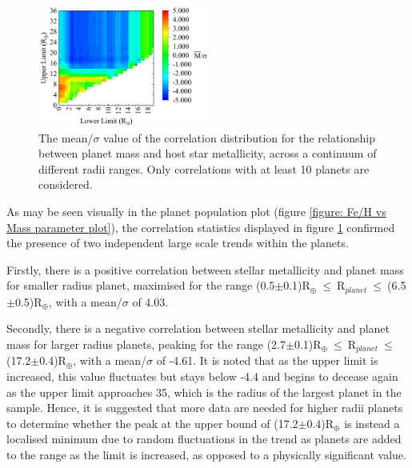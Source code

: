 \documentclass[a4paper,twocolumn,12pt]{article}
\begin{document}
\begin{figure}[h!]
    \centering
    \includegraphics[width=0.5\textwidth]{Graphs/FeH vs Mass correlations - Radii ranges.pdf}
    \caption{The mean/$\sigma$ value of the correlation distribution for the relationship between planet mass and host star metallicity, across a continuum of different radii ranges. Only correlations with at least 10 planets are considered.}
    \label{figure: Fe/H vs Mass correlations - Radii ranges}
\end{figure}

As may be seen visually in the planet population plot (figure \ref{figure: Fe/H vs Mass parameter plot}), the correlation statistics displayed in figure \ref{figure: Fe/H vs Mass correlations - Radii ranges} confirmed the presence of two independent large scale trends within the planets.

Firstly, there is a positive correlation between stellar metallicity and planet mass for smaller radius planet, maximised for the range (0.5$\pm$0.1)R$_{\oplus}~\leq~$R$_{planet}~\leq~$(6.5$\pm$0.5)R$_{\oplus}$, with a mean/$\sigma$ of 4.03. %

Secondly, there is a negative correlation between stellar metallicity and planet mass for larger radius planets, peaking for the range (2.7$\pm$0.1)R$_{\oplus}~\leq~$R$_{planet}~\leq~$(17.2$\pm$0.4)R$_{\oplus}$, with a mean/$\sigma$ of -4.61. It is noted that as the upper limit is increased, this value fluctuates but stays below -4.4 and begins to decease again as the upper limit approaches 35, which is the radius of the largest planet in the sample. Hence, it is suggested that more data are needed for higher radii planets to determine whether the peak at the upper bound of (17.2$\pm$0.4)R$_{\oplus}$ is instead a localised minimum due to random fluctuations in the trend as planets are added to the range as the limit is increased, as opposed to a physically significant value.
\end{document}
